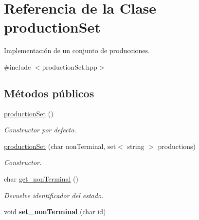 \hypertarget{classproduction_set}{}\section{Referencia de la Clase production\+Set}
\label{classproduction_set}


Implementación de un conjunto de producciones.  




{\ttfamily \#include $<$production\+Set.\+hpp$>$}

\subsection*{Métodos públicos}
\begin{DoxyCompactItemize}
\item 
\mbox{\label{classproduction_set_a9d609b9ba431f52fe92f25fdf80f1e29}} 
\mbox{\hyperlink{classproduction_set_a9d609b9ba431f52fe92f25fdf80f1e29}{production\+Set}} ()
\begin{DoxyCompactList}\small\item\em Constructor por defecto. \end{DoxyCompactList}\item 
\mbox{\label{classproduction_set_a45cf1c8b23b430a979194788111ebd05}} 
\mbox{\hyperlink{classproduction_set_a45cf1c8b23b430a979194788111ebd05}{production\+Set}} (char non\+Terminal, set$<$ string $>$ productions)
\begin{DoxyCompactList}\small\item\em Constructor. \end{DoxyCompactList}\item 
\mbox{\label{classproduction_set_ad8dbc8d5ac4cda65a71f50a5222fc480}} 
char \mbox{\hyperlink{classproduction_set_ad8dbc8d5ac4cda65a71f50a5222fc480}{get\+\_\+non\+Terminal}} ()
\begin{DoxyCompactList}\small\item\em Devuelve identificador del estado. \end{DoxyCompactList}\item 
\mbox{\label{classproduction_set_a5ca47e4b246850aeb5e889a0d35df91a}} 
void {\bfseries set\+\_\+non\+Terminal} (char id)
\item 

\end{DoxyCompactItemize}
